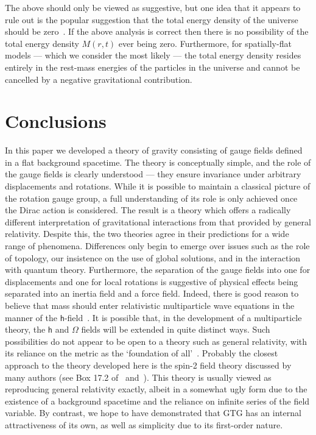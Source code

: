 \documentclass[a4paper]{article}
\numberwithin{equation}{section}
\newcommand{\Om}{\Omega}
\newcommand{\lih}{\mathsf{h}}
\newcommand{\hu}{\lih}
\begin{document}
The above should only be viewed as suggestive, but one idea that it
appears to rule out is the popular suggestion that the total energy
density of the universe should be zero~\cite{try73,try84}.  If the
above analysis is correct then there is no possibility of the total
energy density $M(r,t)$ ever being zero.  Furthermore, for
spatially-flat models --- which we consider the most likely --- the
total energy density resides entirely in the rest-mass energies of the
particles in the universe and cannot be cancelled by a negative
gravitational contribution.




\section{Conclusions}

In this paper we developed a theory of gravity consisting of gauge
fields defined in a flat background spacetime.  The theory is
conceptually simple, and the role of the gauge fields is clearly
understood --- they ensure invariance under arbitrary displacements
and rotations.  While it is possible to maintain a classical picture
of the rotation gauge group, a full understanding of its role is only
achieved once the Dirac action is considered.  The result is a theory
which offers a radically different interpretation of gravitational
interactions from that provided by general relativity.  Despite this,
the two theories agree in their predictions for a wide range of
phenomena.  Differences only begin to emerge over issues such as the
role of topology, our insistence on the use of global solutions, and
in the interaction with quantum theory.  Furthermore, the separation
of the gauge fields into one for displacements and one for local
rotations is suggestive of physical effects being separated into an
inertia field and a force field.  Indeed, there is good reason to
believe that mass should enter relativistic multiparticle wave
equations in the manner of the $\lih$-field~\cite{DGL95-elphys}.  It
is possible that, in the development of a multiparticle theory, the
$\hu$ and $\Om$ fields will be extended in quite distinct ways.
Such possibilities do not appear to be open to a theory such as
general relativity, with its reliance on the metric as the `foundation
of all'~\cite{mis-grav}.  Probably the closest approach to the theory
developed here is the spin-2 field theory discussed by many authors
(see Box 17.2 of~\cite{mis-grav} and~\cite{fey-grav}).  This theory is
usually viewed as reproducing general relativity exactly, albeit in a
somewhat ugly form due to the existence of a background spacetime and
the reliance on infinite series of the field variable.  By contrast,
we hope to have demonstrated that GTG has an internal attractiveness
of its own, as well as simplicity due to its first-order nature.
\end{document}
